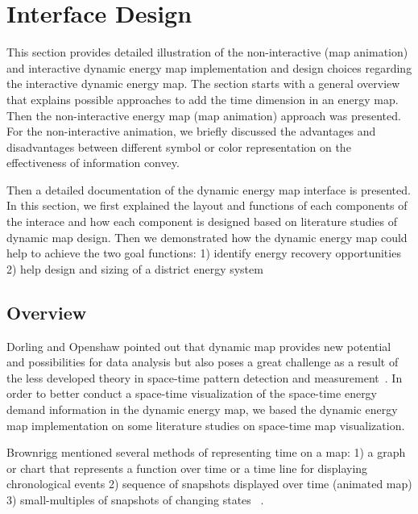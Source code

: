 
\chapter{Interface Design} %

\label{Chapter6} %


This section provides detailed illustration of the non-interactive
(map animation) and interactive dynamic energy map implementation and
design choices regarding the interactive dynamic energy map. The
section starts with a general overview that explains possible
approaches to add the time dimension in an energy map. Then the
non-interactive energy map (map animation) approach was presented. For
the non-interactive animation, we briefly discussed the advantages and
disadvantages between different symbol or color representation on the
effectiveness of information convey.

Then a detailed documentation of the dynamic energy map interface is
presented. In this section, we first explained the layout and
functions of each components of the interace and how each component is
designed based on literature studies of dynamic map design. Then we
demonstrated how the dynamic energy map could help to achieve the two
goal functions: 1) identify energy recovery opportunities 2) help
design and sizing of a district energy system

\section{Overview}

Dorling and Openshaw pointed out that dynamic map provides new
potential and possibilities for data analysis but also poses a great
challenge as a result of the less developed theory in space-time
pattern detection and measurement~\cite{Dorling1992}. In order to
better conduct a space-time visualization of the space-time energy
demand information in the dynamic energy map, we based the dynamic
energy map implementation on some literature studies on space-time map
visualization.

Brownrigg mentioned several methods of representing time on a map: 1)
a graph or chart that represents a function over time or a time line
for displaying chronological events 2) sequence of snapshots displayed
over time (animated map) 3) small-multiples of snapshots of changing
states ~\cite{Brownrigg2005}.

